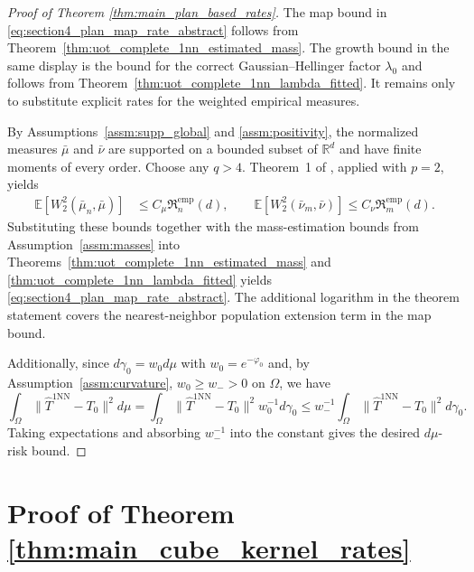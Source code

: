 \documentclass[11pt,reqno]{amsart}
\theoremstyle{definition}
\renewcommand{\hat}{\widehat}
\newcommand{\Ep}{\mathbb{E}}
\begin{document}
\begin{proof}[Proof of Theorem \ref{thm:main_plan_based_rates}]
The map bound in \eqref{eq:section4_plan_map_rate_abstract} follows from Theorem~\ref{thm:uot_complete_1nn_estimated_mass}. The growth bound in the same display is the bound for the correct Gaussian--Hellinger factor $\lambda_0$ and follows from Theorem~\ref{thm:uot_complete_1nn_lambda_fitted}. It remains only to substitute explicit rates for the weighted empirical measures.

By Assumptions~\ref{assm:supp_global} and \ref{assm:positivity}, the normalized measures $\bar\mu$ and $\bar\nu$ are supported on a bounded subset of $\mathbb{R}^d$ and have finite moments of every order. Choose any $q>4$. Theorem~1 of \cite{fournier2015rate}, applied with $p=2$, yields
\begin{align*}
    \Ep[W_2^2(\bar\mu_n,\bar\mu)]
    &\le C_\mu \mathfrak R_n^{\mathrm{emp}}(d),
    \qquad
    \Ep[W_2^2(\bar\nu_m,\bar\nu)]
    \le C_\nu \mathfrak R_m^{\mathrm{emp}}(d).
\end{align*}
Substituting these bounds together with the mass-estimation bounds from Assumption~\ref{assm:masses} into Theorems~\ref{thm:uot_complete_1nn_estimated_mass} and \ref{thm:uot_complete_1nn_lambda_fitted} yields \eqref{eq:section4_plan_map_rate_abstract}. The additional logarithm in the theorem statement covers the nearest-neighbor population extension term in the map bound.

Additionally, since \(d\gamma_0=w_0d\mu\) with
\(w_0=e^{-\varphi_0}\) and, by Assumption~\ref{assm:curvature},
\(w_0\ge w_->0\) on \(\Omega\), we have
\[
    \int_\Omega \|\hat T^{\mathrm{1NN}}-T_0\|^2 d\mu
    =
    \int_\Omega \|\hat T^{\mathrm{1NN}}-T_0\|^2 w_0^{-1} d\gamma_0
    \le
    w_-^{-1}
    \int_\Omega \|\hat T^{\mathrm{1NN}}-T_0\|^2 d\gamma_0 .
\]
Taking expectations and absorbing \(w_-^{-1}\) into the constant gives the desired
\(d\mu\)-risk bound.
\end{proof}


\section{Proof of Theorem \ref{thm:main_cube_kernel_rates}}\label{sec:proof_cube_kernel_rates}
\end{document}
